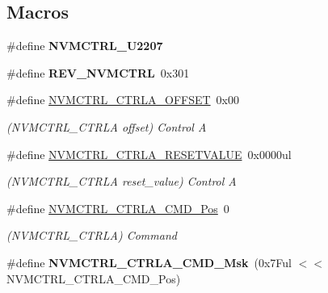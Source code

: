 \subsection*{Macros}
\begin{DoxyCompactItemize}
\item 
\hypertarget{group___s_a_m_l21___n_v_m_c_t_r_l_ga3ea48740d5f4e1f68a7dd06753eb20d5}{}\#define {\bfseries N\+V\+M\+C\+T\+R\+L\+\_\+\+U2207}\label{group___s_a_m_l21___n_v_m_c_t_r_l_ga3ea48740d5f4e1f68a7dd06753eb20d5}

\item 
\hypertarget{group___s_a_m_l21___n_v_m_c_t_r_l_gad91d0ed581519e0bb057ede9db891e87}{}\#define {\bfseries R\+E\+V\+\_\+\+N\+V\+M\+C\+T\+R\+L}~0x301\label{group___s_a_m_l21___n_v_m_c_t_r_l_gad91d0ed581519e0bb057ede9db891e87}

\item 
\hypertarget{group___s_a_m_l21___n_v_m_c_t_r_l_ga4853195148a26c13e84af06b27099a5a}{}\#define \hyperlink{group___s_a_m_l21___n_v_m_c_t_r_l_ga4853195148a26c13e84af06b27099a5a}{N\+V\+M\+C\+T\+R\+L\+\_\+\+C\+T\+R\+L\+A\+\_\+\+O\+F\+F\+S\+E\+T}~0x00\label{group___s_a_m_l21___n_v_m_c_t_r_l_ga4853195148a26c13e84af06b27099a5a}

\begin{DoxyCompactList}\small\item\em (N\+V\+M\+C\+T\+R\+L\+\_\+\+C\+T\+R\+L\+A offset) Control A \end{DoxyCompactList}\item 
\hypertarget{group___s_a_m_l21___n_v_m_c_t_r_l_gafda7d874f8e5f91f9590105c7bc984b5}{}\#define \hyperlink{group___s_a_m_l21___n_v_m_c_t_r_l_gafda7d874f8e5f91f9590105c7bc984b5}{N\+V\+M\+C\+T\+R\+L\+\_\+\+C\+T\+R\+L\+A\+\_\+\+R\+E\+S\+E\+T\+V\+A\+L\+U\+E}~0x0000ul\label{group___s_a_m_l21___n_v_m_c_t_r_l_gafda7d874f8e5f91f9590105c7bc984b5}

\begin{DoxyCompactList}\small\item\em (N\+V\+M\+C\+T\+R\+L\+\_\+\+C\+T\+R\+L\+A reset\+\_\+value) Control A \end{DoxyCompactList}\item 
\hypertarget{group___s_a_m_l21___n_v_m_c_t_r_l_ga5346c6f8ba695f7cadb7f07bde6e25f8}{}\#define \hyperlink{group___s_a_m_l21___n_v_m_c_t_r_l_ga5346c6f8ba695f7cadb7f07bde6e25f8}{N\+V\+M\+C\+T\+R\+L\+\_\+\+C\+T\+R\+L\+A\+\_\+\+C\+M\+D\+\_\+\+Pos}~0\label{group___s_a_m_l21___n_v_m_c_t_r_l_ga5346c6f8ba695f7cadb7f07bde6e25f8}

\begin{DoxyCompactList}\small\item\em (N\+V\+M\+C\+T\+R\+L\+\_\+\+C\+T\+R\+L\+A) Command \end{DoxyCompactList}\item 
\hypertarget{group___s_a_m_l21___n_v_m_c_t_r_l_ga0d19f301cea0ef37b638f1961a1abae9}{}\#define {\bfseries N\+V\+M\+C\+T\+R\+L\+\_\+\+C\+T\+R\+L\+A\+\_\+\+C\+M\+D\+\_\+\+Msk}~(0x7\+Ful $<$$<$ N\+V\+M\+C\+T\+R\+L\+\_\+\+C\+T\+R\+L\+A\+\_\+\+C\+M\+D\+\_\+\+Pos)\label{group___s_a_m_l21___n_v_m_c_t_r_l_ga0d19f301cea0ef37b638f1961a1abae9}


\end{DoxyCompactItemize}
